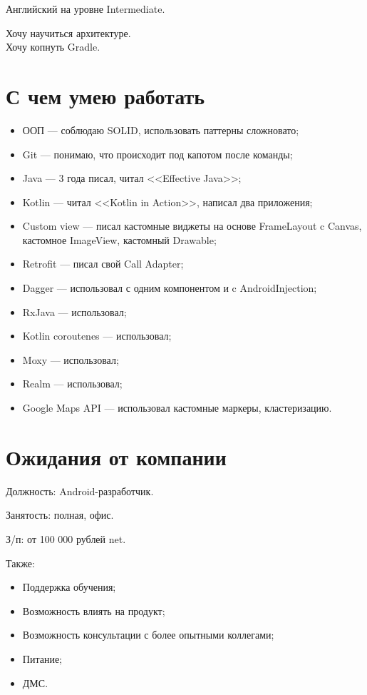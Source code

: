 \documentclass[a4paper,12pt]{article}
\begin{document}
    Английский на уровне Intermediate.

    Хочу научиться архитектуре.\\
    Хочу копнуть Gradle.

    \section*{С чем умею работать}%

    \begin{itemize}
        \item ООП --- соблюдаю SOLID, использовать паттерны сложновато;
        \item Git --- понимаю, что происходит под капотом после команды;
        \item Java --- 3 года писал, читал <<Effective Java>>;
        \item Kotlin --- читал <<Kotlin in Action>>, написал два приложения;
        \item Custom view --- писал кастомные виджеты на основе FrameLayout c Canvas, кастомное ImageView, кастомный Drawable;
        \item Retrofit --- писал свой Call Adapter;
        \item Dagger --- использовал с одним компонентом и c AndroidInjection;
        \item RxJava --- использовал;
        \item Kotlin coroutenes --- использовал;
        \item Moxy --- использовал;
        \item Realm --- использовал;
        \item Google Maps API --- использовал кастомные маркеры, кластеризацию.
    \end{itemize}

    \section*{Ожидания от компании}

    Должность: Android-разработчик.\par
    Занятость: полная, офис.\par
    З/п: от 100 000 рублей net.\par
    Также:
    \begin{itemize}
        \item Поддержка обучения;
        \item Возможность влиять на продукт;
        \item Возможность консультации с более опытными коллегами;
        \item Питание;
        \item ДМС.
    \end{itemize}
\end{document}
